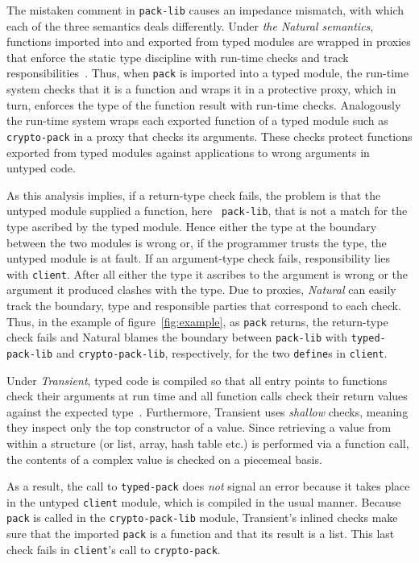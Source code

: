 The mistaken comment in {\tt pack-lib} causes an impedance mismatch, with which each
of the three semantics deals differently.  Under {\it the Natural semantics\/},
functions imported into and exported from typed modules are wrapped in proxies that
enforce the static type discipline with run-time checks and track
responsibilities~\citep{tf-popl-2008, tfffgksst-snapl-2017}. Thus, when {\tt pack}
is imported into a typed module, the run-time system checks that it is a function
and wraps it in a protective proxy, which in turn, enforces the type of the function
result with run-time checks.  Analogously the run-time system wraps each exported
function of a typed module such as {\tt crypto-pack} in a proxy that checks its
arguments.  These checks protect functions exported from typed modules against
applications to wrong arguments in untyped code.

As this analysis implies, if a return-type check fails, the problem is
that the untyped module supplied a function, here {\tt
pack-lib}, that is not a  match for the type ascribed by the typed module. 
Hence either the type at the boundary between the two modules is wrong or, 
if the programmer trusts the type, the untyped module is at fault.
If an argument-type check fails, responsibility  lies with
{\tt client}. After all either the type it ascribes to the argument is
wrong or the argument it produced clashes with the type. Due to 
proxies, {\it Natural\/} can easily track the 
boundary, type and responsible parties that correspond to each check. 
Thus, in the example of figure~\ref{fig:example}, as
\texttt{pack} returns, the return-type check fails and Natural blames
the boundary between \texttt{pack-lib} with {\tt typed-pack-lib} and
{\tt crypto-pack-lib}, respectively, for the two {\tt define}s in {\tt client}.

Under {\it Transient\/}, typed code is compiled so that all entry points to
functions check their arguments at run time and all function calls check their
return values against the expected type~\citep{vss-popl-2017}.  Furthermore,
Transient uses \emph{shallow} checks, meaning they inspect only the top
constructor of a value. Since retrieving a value from within a structure (or
list, array, hash table etc.) is performed via a function call, the contents of
a complex value is checked on a piecemeal basis.

As a result, the call to \texttt{typed-pack} does {\em not\/} signal an error
because it takes place in the untyped {\tt client} module, which is compiled in
the usual manner. Because {\tt pack} is called in the {\tt crypto-pack-lib}
module, Transient's inlined checks make sure that the imported
\texttt{pack} is a function and that its result is a list. This
last check fails in \texttt{client}'s call to {\tt crypto-pack}.

